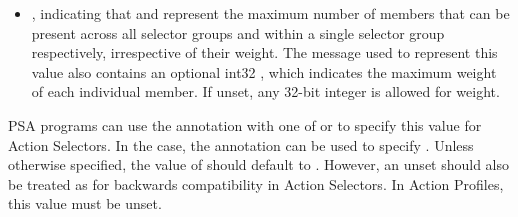 \documentclass[11pt]{article}
\begin{document}
{\begin{itemize}
\begin{itemize}[noitemsep,topsep=\mdcompacttopsep]
\item{}, indicating that  and  represent
the maximum number of members that can be present across all selector
groups and within a single selector group respectively, irrespective of
their weight. The  message used to represent this value also
contains an optional int32 , which indicates the
maximum weight of each individual member. If unset, any 32-bit integer is
allowed for weight.%
\end{itemize}%
\end{itemize}%

\noindent{}  PSA programs can use the  annotation with one of
   or  to specify this value for Action
  Selectors. In the  case, the  annotation
  can be used to specify . Unless otherwise specified, the
  value of  should default to .
  However, an unset  should also be treated as
   for backwards compatibility in Action Selectors. In Action
  Profiles, this value must be unset.%

}
\end{document}
